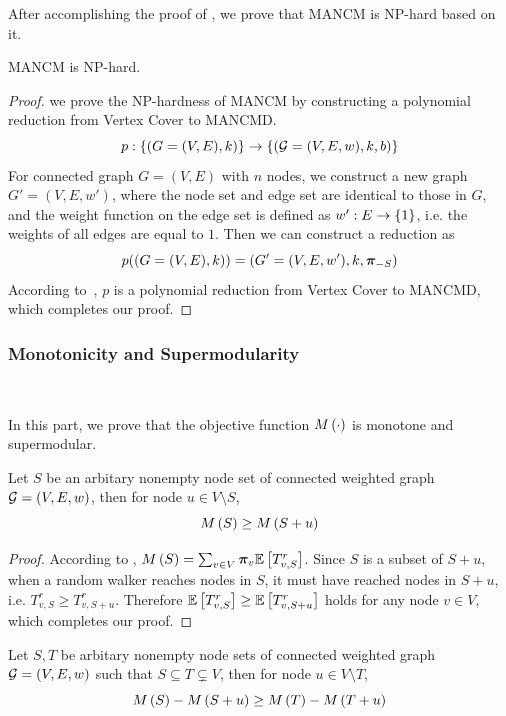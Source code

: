 \documentclass[sigconf]{acmart}
\begin{document}
After accomplishing the proof of , we prove that MANCM is NP-hard based on it.
\begin{theorem}\label{thm:np-hard}
    MANCM is NP-hard.
\end{theorem}
\begin{proof}
    we prove the NP-hardness of MANCM by constructing a polynomial reduction from Vertex Cover to MANCMD.
    \[p:\left\{(G=(V,E),k) \right\}\to\left\{(\mathcal{G}=(V,E,w),k,b) \right\}\]
    For connected graph \(G=(V,E)\) with \(n\) nodes, we construct a new graph \(G'=(V,E,w')\), where the node set and edge set are identical to those in \(G\), and the weight function on the edge set is defined as \(w':E\to\left\{1 \right\}\), i.e. the weights of all edges are equal to \(1\). Then we can construct a reduction as
    \[p((G=(V,E),k))=(G'=(V,E,w'),k,\boldsymbol{\pi}_{-S})\]
    According to~, \(p\) is a polynomial reduction from Vertex Cover to MANCMD, which completes our proof.
\end{proof}

\subsubsection{Monotonicity and Supermodularity}

\

In this part, we prove that the objective function \(M\left(\cdot\right)\) is monotone and supermodular.
\begin{theorem}[Monotonicity]\label{thm:mono}
    Let \(S\) be an arbitary nonempty node set of connected weighted graph \(\mathcal{G}=(V,E,w)\), then for node \(u\in V\setminus S\),
    \[M\left(S\right)\ge M\left(S+u\right)\]
\end{theorem}

\begin{proof}
    According to , \(M\left(S\right)=\sum_{v\in V}\boldsymbol{\pi}_v\mathbb{E}\left[T_{v,S}^r\right]\). Since \(S\) is a subset of \(S+u\), when a random walker reaches nodes in \(S\), it must have reached nodes in \(S+u\), i.e. \(T_{v,S}^r\ge T_{v,S+u}^r\). Therefore \(\mathbb{E}\left[T_{v,S}^r\right]\ge\mathbb{E}\left[T_{v,S+u}^r\right]\) holds for any node \(v\in V\), which completes our proof.
\end{proof}

\begin{theorem}[Supermodularity]\label{thm:supermod}
    Let \(S,T\) be arbitary nonempty node sets of connected weighted graph \(\mathcal{G}=(V,E,w)\) such that \(S\subseteq T\subsetneq V\), then for node \(u\in V\setminus T\),
    \[M\left(S\right)-M\left(S+u\right)\ge M\left(T\right)-M\left(T+u\right)\]
\end{theorem}
\end{document}

